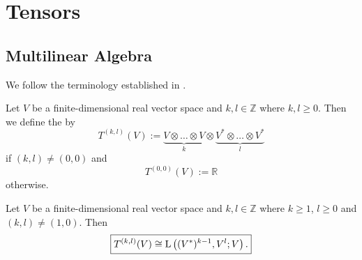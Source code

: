 \chapter{Tensors}
\section{Multilinear Algebra}
We follow the terminology established in \cite[312]{lee:smooth_manifolds:2013}. 
\begin{definition}
Let $V$ be a finite-dimensional real vector space and $k,l \in \mathbb{Z}$ where $k,l \geq 0$. Then we define the  by
\begin{equation}
T^{(k,l)}(V) := \underbrace{V \otimes \dots \otimes V}_{k} \otimes \underbrace{V^* \otimes \dots \otimes V^*}_{l}
\end{equation}
\noindent if $(k,l) \neq (0,0)$ and
\begin{equation}
T^{(0,0)}(V) := \mathbb{R}
\end{equation}
\noindent otherwise.
\end{definition}

\begin{proposition}
Let $V$ be a finite-dimensional real vector space and $k,l \in \mathbb{Z}$ where $k \geq 1$, $l \geq 0$ and $(k,l) \neq (1,0)$. Then 
\begin{equation}
\boxed{T^{(k,l)}(V) \cong \Lrm\del[1]{(V^*)^{k - 1},V^l;V}.}
\end{equation}
\end{proposition}

\begin{lemma}

\end{lemma}

